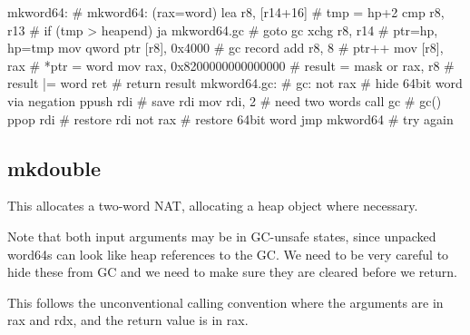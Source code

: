 \begin{asm}
mkword64:                                   # mkword64: (rax=word)
	lea	r8, [r14+16]                #   tmp = hp+2
	cmp	r8, r13                     #   if (tmp > heapend)
	ja	mkword64.gc                 #     goto gc
	xchg	r8, r14                     #   ptr=hp, hp=tmp
	mov	qword ptr [r8], 0x4000      #   gc record
	add	r8, 8                       #   ptr++
	mov	[r8], rax                   #   *ptr = word
	mov	rax, 0x8200000000000000     #   result = mask
	or	rax, r8                     #   result |= word
	ret                                 #   return result
mkword64.gc:                                # gc:
	not	rax                         #   hide 64bit word via negation
	ppush	rdi                         #   save rdi
	mov	rdi, 2                      #   need two words
	call	gc                          #   gc()
	ppop	rdi                         #   restore rdi
	not	rax                         #   restore 64bit word
	jmp	mkword64                    #   try again
\end{asm}

\subsection{mkdouble}

This allocates a two-word NAT, allocating a heap object where necessary.

Note that both input arguments may be in GC-unsafe states, since unpacked
word64s can look like heap references to the GC.  We need to be very
careful to hide these from GC and we need to make sure they are cleared
before we return.

This follows the unconventional calling convention where the arguments
are in rax and rdx, and the return value is in rax.

